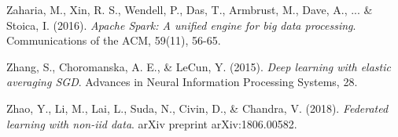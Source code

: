\begin{thebibliography}{99}
	Zaharia, M., Xin, R. S., Wendell, P., Das, T., Armbrust, M., Dave, A., ... \& Stoica, I. (2016).
	\textit{Apache Spark: A unified engine for big data processing}.
	Communications of the ACM, 59(11), 56-65.
	
	Zhang, S., Choromanska, A. E., \& LeCun, Y. (2015).
	\textit{Deep learning with elastic averaging SGD}.
	Advances in Neural Information Processing Systems, 28.
	
	Zhao, Y., Li, M., Lai, L., Suda, N., Civin, D., \& Chandra, V. (2018).
	\textit{Federated learning with non-iid data}.
	arXiv preprint arXiv:1806.00582.
	
\end{thebibliography}
